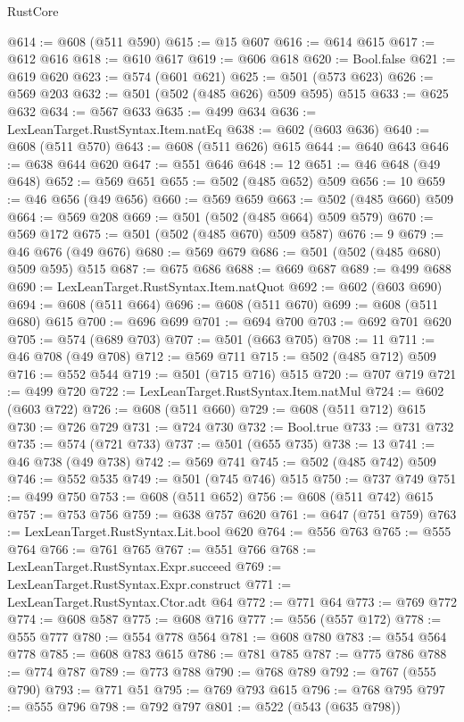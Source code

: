\begin{lexlean}{RustCore}
\begin{coremodule}
@614 := @608 (@511 @590)
@615 := @15 @607
@616 := @614 @615
@617 := @612 @616
@618 := @610 @617
@619 := @606 @618
@620 := Bool.false
@621 := @619 @620
@623 := @574 (@601 @621)
@625 := @501 (@573 @623)
@626 := @569 @203
@632 := @501 (@502 (@485 @626) @509 @595) @515
@633 := @625 @632
@634 := @567 @633
@635 := @499 @634
@636 := LexLeanTarget.RustSyntax.Item.natEq
@638 := @602 (@603 @636)
@640 := @608 (@511 @570)
@643 := @608 (@511 @626) @615
@644 := @640 @643
@646 := @638 @644 @620
@647 := @551 @646
@648 := 12
@651 := @46 @648 (@49 @648)
@652 := @569 @651
@655 := @502 (@485 @652) @509
@656 := 10
@659 := @46 @656 (@49 @656)
@660 := @569 @659
@663 := @502 (@485 @660) @509
@664 := @569 @208
@669 := @501 (@502 (@485 @664) @509 @579)
@670 := @569 @172
@675 := @501 (@502 (@485 @670) @509 @587)
@676 := 9
@679 := @46 @676 (@49 @676)
@680 := @569 @679
@686 := @501 (@502 (@485 @680) @509 @595) @515
@687 := @675 @686
@688 := @669 @687
@689 := @499 @688
@690 := LexLeanTarget.RustSyntax.Item.natQuot
@692 := @602 (@603 @690)
@694 := @608 (@511 @664)
@696 := @608 (@511 @670)
@699 := @608 (@511 @680) @615
@700 := @696 @699
@701 := @694 @700
@703 := @692 @701 @620
@705 := @574 (@689 @703)
@707 := @501 (@663 @705)
@708 := 11
@711 := @46 @708 (@49 @708)
@712 := @569 @711
@715 := @502 (@485 @712) @509
@716 := @552 @544
@719 := @501 (@715 @716) @515
@720 := @707 @719
@721 := @499 @720
@722 := LexLeanTarget.RustSyntax.Item.natMul
@724 := @602 (@603 @722)
@726 := @608 (@511 @660)
@729 := @608 (@511 @712) @615
@730 := @726 @729
@731 := @724 @730
@732 := Bool.true
@733 := @731 @732
@735 := @574 (@721 @733)
@737 := @501 (@655 @735)
@738 := 13
@741 := @46 @738 (@49 @738)
@742 := @569 @741
@745 := @502 (@485 @742) @509
@746 := @552 @535
@749 := @501 (@745 @746) @515
@750 := @737 @749
@751 := @499 @750
@753 := @608 (@511 @652)
@756 := @608 (@511 @742) @615
@757 := @753 @756
@759 := @638 @757 @620
@761 := @647 (@751 @759)
@763 := LexLeanTarget.RustSyntax.Lit.bool @620
@764 := @556 @763
@765 := @555 @764
@766 := @761 @765
@767 := @551 @766
@768 := LexLeanTarget.RustSyntax.Expr.succeed
@769 := LexLeanTarget.RustSyntax.Expr.construct
@771 := LexLeanTarget.RustSyntax.Ctor.adt @64
@772 := @771 @64
@773 := @769 @772
@774 := @608 @587
@775 := @608 @716
@777 := @556 (@557 @172)
@778 := @555 @777
@780 := @554 @778 @564
@781 := @608 @780
@783 := @554 @564 @778
@785 := @608 @783 @615
@786 := @781 @785
@787 := @775 @786
@788 := @774 @787
@789 := @773 @788
@790 := @768 @789
@792 := @767 (@555 @790)
@793 := @771 @51
@795 := @769 @793 @615
@796 := @768 @795
@797 := @555 @796
@798 := @792 @797
@801 := @522 (@543 (@635 @798))

\end{coremodule}
\end{lexlean}

